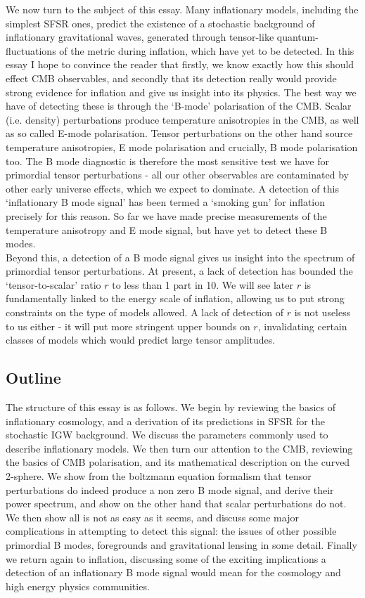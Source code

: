 \documentclass[a4paper,10pt]{article}
\begin{document}
We now turn to the subject of this essay. Many inflationary models, including the simplest SFSR ones, predict the existence of a stochastic background of inflationary gravitational waves, generated through tensor-like quantum-fluctuations of the metric during inflation, which have yet to be detected. In this essay I hope to convince the reader that firstly, we know exactly how this should effect CMB observables, and secondly that its detection really would provide strong evidence for inflation and give us insight into its physics. The best way we have of detecting these is through the `B-mode' polarisation of the CMB. Scalar (i.e. density) perturbations produce temperature anisotropies in the CMB, as well as so called E-mode polarisation. Tensor perturbations on the other hand source temperature anisotropies, E mode polarisation and crucially, B mode polarisation too. The B mode diagnostic is therefore the most sensitive test we have for primordial tensor perturbations - all our other observables are contaminated by other early universe effects, which we expect to dominate. A detection of this `inflationary B mode signal' has been termed a `smoking gun' for inflation precisely for this reason. So far we have made precise measurements of the temperature anisotropy and E mode signal, but have yet to detect these B modes. \\

Beyond this, a detection of a B mode signal gives us insight into the spectrum of primordial tensor perturbations. At present, a lack of detection has bounded the `tensor-to-scalar' ratio $r$ to less than 1 part in 10. We will see later $r$ is fundamentally linked to the energy scale of inflation, allowing us to put strong constraints on the type of models allowed. A lack of detection of $r$ is not useless to us either - it will put more stringent upper bounds on $r$, invalidating certain classes of models which would predict large tensor amplitudes.\\

\subsection{Outline}

The structure of this essay is as follows. We begin by reviewing the basics of inflationary cosmology, and a derivation of its predictions in SFSR for the stochastic IGW background. We discuss the parameters commonly used to describe inflationary models. We then turn our attention to the CMB, reviewing the basics of CMB polarisation, and its mathematical description on the curved 2-sphere. We show from the boltzmann equation formalism that tensor perturbations do indeed produce a non zero B mode signal, and derive their power spectrum, and show on the other hand that scalar perturbations do not. We then show all is not as easy as it seems, and discuss some major complications in attempting to detect this signal: the issues of other possible primordial B modes, foregrounds and gravitational lensing in some detail. Finally we return again to inflation, discussing some of the exciting implications a detection of an inflationary B mode signal would mean for the cosmology and high energy physics communities. 
\end{document}
